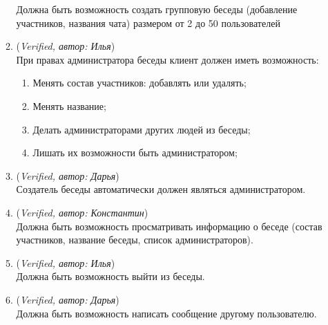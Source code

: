 \begin{enumerate}
\begin{enumerate}
		Должна быть возможность создать групповую беседы (добавление участников, названия чата) размером от 2 до 50 пользователей
		\item (\textit{Verified, автор: Илья})\\
		При правах администратора беседы клиент должен иметь возможность:
		\begin{enumerate}
			\item Менять состав участников: добавлять или удалять;
			\item Менять название;
			\item Делать администраторами других людей из беседы;
			\item Лишать их возможности быть администратором; 
		\end{enumerate}
		\item (\textit{Verified, автор: Дарья})\\
		Создатель беседы автоматически должен являться администратором.
		\item (\textit{Verified, автор: Константин})\\
		Должна быть возможность просматривать информацию о беседе (состав участников, название беседы, список администраторов).
		\item (\textit{Verified, автор: Илья})\\
		Должна быть возможность выйти из беседы. 
		\item (\textit{Verified, автор: Дарья})\\
		Должна быть возможность написать сообщение другому пользователю. 
	\end{enumerate}
	\end{enumerate}

\renewcommand{\labelenumi}{\arabic{enumi}.}

\renewcommand{\labelenumii}{\arabic{enumii}.}

\renewcommand{\labelenumiii}{\arabic{enumiii}.}
